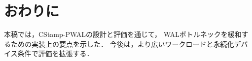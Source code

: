 \section{おわりに}

本稿では，CStamp-PWALの設計と評価を通じて，
WALボトルネックを緩和するための実装上の要点を示した．
今後は，より広いワークロードと永続化デバイス条件で評価を拡張する．
